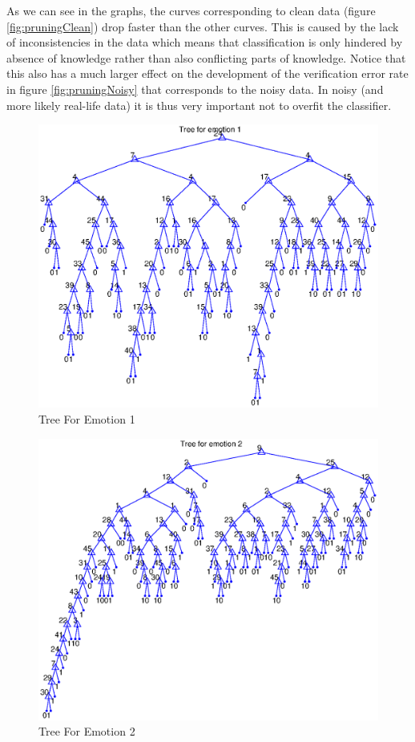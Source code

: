 \documentclass[11pt,a4paper]{article}
\begin{document}
As we can see in the graphs, the curves corresponding to clean data (figure \ref{fig:pruningClean}) drop faster than the other curves. This is caused by the lack of inconsistencies in the data which means that classification is only hindered by absence of knowledge rather than also conflicting parts of knowledge. Notice that this also has a much larger effect on the development of the verification error rate in figure \ref{fig:pruningNoisy} that corresponds to the noisy data. In noisy (and more likely real-life data) it is thus very important not to overfit the classifier.

\begin{figure}[!hb]
	\centering
	\includegraphics[width=\textwidth]{trees/tree1.eps}
     \caption{Tree For Emotion 1}
     \label{fig:tree1}
\end{figure}
\begin{figure}[!ht]
	\centering
	\includegraphics[width=\textwidth]{trees/tree2.eps}
     \caption{Tree For Emotion 2}
     \label{fig:tree2}
\end{figure}
\end{document}
